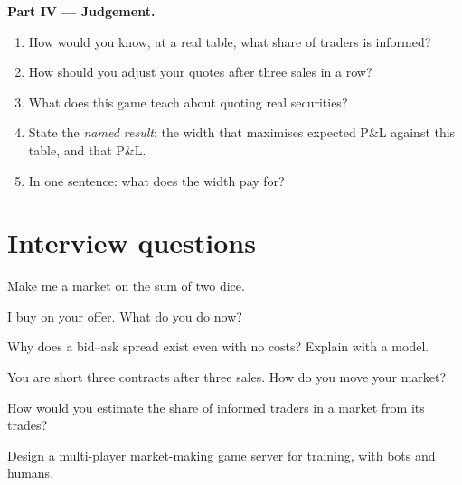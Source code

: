 \begin{problem}
\medskip\noindent\textbf{Part IV --- Judgement.}
\begin{enumerate}[resume]
\item How would you know, at a real table, what share of traders is informed?
\item How should you adjust your quotes after three sales in a row?
\item What does this game teach about quoting real securities?
\item State the \emph{named result}: the width that maximises expected P\&L against this
table, and that P\&L.
\item In one sentence: what does the width pay for?
\end{enumerate}
\end{problem}

\section{Interview questions}

\begin{interviewq}\label{iq:m2:market-making-games:1}
Make me a market on the sum of two dice.
\end{interviewq}

\begin{interviewq}\label{iq:m2:market-making-games:2}
I buy on your offer. What do you do now?
\end{interviewq}

\begin{interviewq}\label{iq:m2:market-making-games:3}
Why does a bid--ask spread exist even with no costs? Explain with a model.
\end{interviewq}

\begin{interviewq}\label{iq:m2:market-making-games:4}
You are short three contracts after three sales. How do you move your market?
\end{interviewq}

\begin{interviewq}\label{iq:m2:market-making-games:5}
How would you estimate the share of informed traders in a market from its trades?
\end{interviewq}

\begin{interviewq}\label{iq:m2:market-making-games:6}
Design a multi-player market-making game server for training, with bots and humans.
\end{interviewq}
